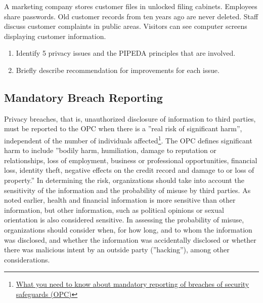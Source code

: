 \begin{exerciseboxpaper}
A marketing company stores customer files in unlocked filing cabinets. Employees share passwords. Old customer records from ten years ago are never deleted. Staff discuss customer complaints in public areas. Visitors can see computer screens displaying customer information. \\

\begin{enumerate}
\item Identify 5 privacy issues and the PIPEDA principles that are involved.
\item Briefly describe recommendation for improvements for each issue.
\end{enumerate}
\end{exerciseboxpaper}

\subsection*{Mandatory Breach Reporting}

Privacy breaches, that is, unauthorized disclosure of information to third parties, must be reported to the OPC when there is a ''real risk of significant harm'', independent of the number of individuals affected\footnote{\href{https://www.priv.gc.ca/en/privacy-topics/business-privacy/safeguards-and-breaches/privacy-breaches/respond-to-a-privacy-breach-at-your-business/gd_pb_201810/}{What you need to know about mandatory reporting of breaches of security safeguards (OPC)}}. The OPC defines significant harm to include ''bodily harm, humiliation, damage to reputation or relationships, loss of employment, business or professional opportunities, financial loss, identity theft, negative effects on the credit record and damage to or loss of property.'' In determining the risk, organizations should take into account the sensitivity of the information and the probability of misuse by third parties. As noted earlier, health and financial information is more sensitive than other information, but other information, such as political opinions or sexual orientation is also considered sensitive. In assessing the probability of misuse, organizations should consider when, for how long, and to whom the information was disclosed, and whether the information was accidentally disclosed or whether there was malicious intent by an outside party (''hacking''), among other considerations.

